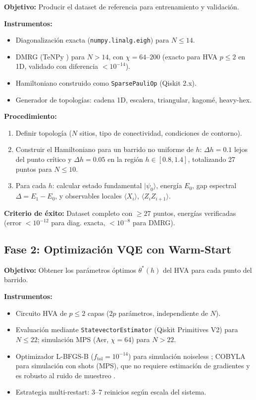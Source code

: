 \documentclass[11pt,a4paper,spanish]{book}
\begin{document}
\textbf{Objetivo:} Producir el dataset de referencia para entrenamiento y validación.

\textbf{Instrumentos:}
\begin{itemize}
    \item Diagonalización exacta (\texttt{numpy.linalg.eigh}) para $N \leq 14$.
    \item DMRG (TeNPy \citep{hauschild2018}) para $N > 14$, con $\chi = 64$--$200$ (exacto para HVA $p \leq 2$ en 1D, validado con diferencia $< 10^{-14}$).
    \item Hamiltoniano construido como \texttt{SparsePauliOp} (Qiskit 2.x).
    \item Generador de topologías: cadena 1D, escalera, triangular, kagomé, heavy-hex.
\end{itemize}

\textbf{Procedimiento:}
\begin{enumerate}
    \item Definir topología ($N$ sitios, tipo de conectividad, condiciones de contorno).
    \item Construir el Hamiltoniano para un barrido no uniforme de $h$: $\Delta h = 0.1$ lejos del punto crítico y $\Delta h = 0.05$ en la región $h \in [0.8, 1.4]$, totalizando 27 puntos para $N \leq 10$.
    \item Para cada $h$: calcular estado fundamental $|\psi_0\rangle$, energía $E_0$, gap espectral $\Delta = E_1 - E_0$, y observables locales $\langle X_i \rangle$, $\langle Z_i Z_{i+1} \rangle$.
\end{enumerate}

\textbf{Criterio de éxito:} Dataset completo con $\geq 27$ puntos, energías verificadas (error $< 10^{-12}$ para diag. exacta, $< 10^{-8}$ para DMRG).

\subsection{Fase 2: Optimización VQE con Warm-Start}

\textbf{Objetivo:} Obtener los parámetros óptimos $\theta^*(h)$ del HVA para cada punto del barrido.

\textbf{Instrumentos:}
\begin{itemize}
    \item Circuito HVA de $p \leq 2$ capas ($2p$ parámetros, independiente de $N$).
    \item Evaluación mediante \texttt{StatevectorEstimator} (Qiskit Primitives V2) para $N \leq 22$; simulación MPS (Aer, $\chi = 64$) para $N > 22$.
    \item Optimizador L-BFGS-B ($f_{\text{tol}} = 10^{-14}$) para simulación noiseless \citep{tilly2022}; COBYLA para simulación con shots (MPS), que no requiere estimación de gradientes y es robusto al ruido de muestreo \citep{tilly2022, singh2025}.
    \item Estrategia multi-restart: 3--7 reinicios según escala del sistema.
\end{itemize}
\end{document}
